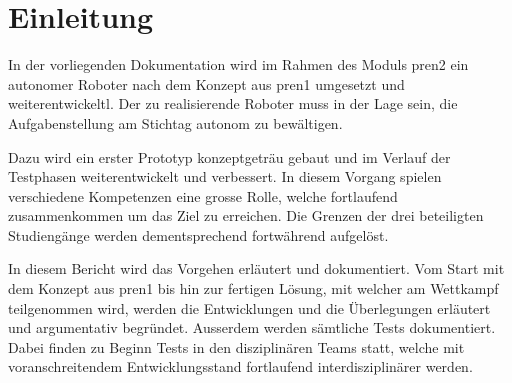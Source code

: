 \section{Einleitung}

In der vorliegenden Dokumentation wird im Rahmen des Moduls \acrfull{pren2} ein autonomer Roboter nach dem Konzept aus \acrfull{pren1} umgesetzt und weiterentwickeltl. Der zu realisierende Roboter muss in der Lage sein, die Aufgabenstellung am Stichtag autonom zu bewältigen.

Dazu wird ein erster Prototyp konzeptgeträu gebaut und im Verlauf der Testphasen weiterentwickelt und verbessert. In diesem Vorgang spielen verschiedene Kompetenzen eine grosse Rolle, welche fortlaufend zusammenkommen um das Ziel zu erreichen. Die Grenzen der drei beteiligten Studiengänge werden dementsprechend fortwährend aufgelöst.

In diesem Bericht wird das Vorgehen erläutert und dokumentiert. Vom Start mit dem Konzept aus \acrfull{pren1} bis hin zur fertigen Lösung, mit welcher am Wettkampf teilgenommen wird, werden die Entwicklungen und die Überlegungen erläutert und argumentativ begründet. Ausserdem werden sämtliche Tests dokumentiert. Dabei finden zu Beginn Tests in den disziplinären Teams statt, welche mit voranschreitendem Entwicklungsstand fortlaufend interdisziplinärer werden.


